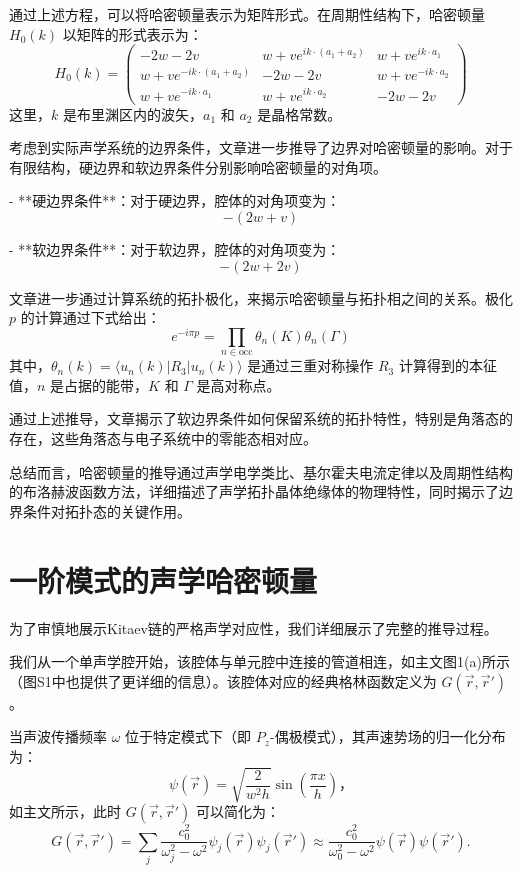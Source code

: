 通过上述方程，可以将哈密顿量表示为矩阵形式。在周期性结构下，哈密顿量 \( H_0(k) \) 以矩阵的形式表示为：
\[
H_0(k) =
\begin{pmatrix}
-2w - 2v & w + v e^{i k \cdot (a_1 + a_2)} & w + v e^{i k \cdot a_1} \\
w + v e^{-i k \cdot (a_1 + a_2)} & -2w - 2v & w + v e^{-i k \cdot a_2} \\
w + v e^{-i k \cdot a_1} & w + v e^{i k \cdot a_2} & -2w - 2v
\end{pmatrix}
\]
这里，\( k \) 是布里渊区内的波矢，\( a_1 \) 和 \( a_2 \) 是晶格常数。


考虑到实际声学系统的边界条件，文章进一步推导了边界对哈密顿量的影响。对于有限结构，硬边界和软边界条件分别影响哈密顿量的对角项。

- **硬边界条件**：对于硬边界，腔体的对角项变为：
  \[
  - (2w + v)
  \]
  
- **软边界条件**：对于软边界，腔体的对角项变为：
  \[
  - (2w + 2v)
  \]


文章进一步通过计算系统的拓扑极化，来揭示哈密顿量与拓扑相之间的关系。极化 \( p \) 的计算通过下式给出：
\[
e^{-i \pi p} = \prod_{n \in \text{occ}} \theta_n(K) \theta_n(\Gamma)
\]
其中，\( \theta_n(k) = \langle u_n(k) | R_3 | u_n(k) \rangle \) 是通过三重对称操作 \( R_3 \) 计算得到的本征值，\( n \) 是占据的能带，\( K \) 和 \( \Gamma \) 是高对称点。


通过上述推导，文章揭示了软边界条件如何保留系统的拓扑特性，特别是角落态的存在，这些角落态与电子系统中的零能态相对应。

总结而言，哈密顿量的推导通过声学电学类比、基尔霍夫电流定律以及周期性结构的布洛赫波函数方法，详细描述了声学拓扑晶体绝缘体的物理特性，同时揭示了边界条件对拓扑态的关键作用。

\section{一阶模式的声学哈密顿量}

为了审慎地展示Kitaev链的严格声学对应性，我们详细展示了完整的推导过程。

我们从一个单声学腔开始，该腔体与单元腔中连接的管道相连，如主文图1(a)所示（图S1中也提供了更详细的信息）。该腔体对应的经典格林函数定义为 \( G(\vec{r}, \vec{r}') \)。

当声波传播频率 \( \omega \) 位于特定模式下（即 \( P_z \)-偶极模式），其声速势场的归一化分布为：
\[
\psi(\vec{r}) = \sqrt{\frac{2}{w^2 h}} \sin\left(\frac{\pi x}{h}\right)，
\]
如主文所示，此时 \( G(\vec{r}, \vec{r}') \) 可以简化为：
\[
G(\vec{r}, \vec{r}') = \sum_j \frac{c_0^2}{\omega_j^2 - \omega^2} \psi_j(\vec{r}) \psi_j(\vec{r}')
\approx \frac{c_0^2}{\omega_0^2 - \omega^2} \psi(\vec{r}) \psi(\vec{r}'). 
\]

